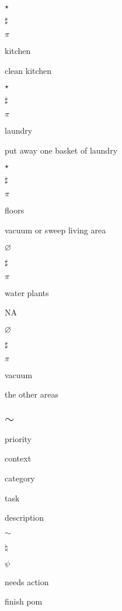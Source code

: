 \documentclass[]{book}
\newenvironment{Shaded}{\begin{snugshade}}{\end{snugshade}}
\newcommand{\KeywordTok}[1]{\textcolor[rgb]{0.13,0.29,0.53}{\textbf{#1}}}
\newcommand{\NormalTok}[1]{#1}
\newcommand{\OperatorTok}[1]{\textcolor[rgb]{0.81,0.36,0.00}{\textbf{#1}}}
\newcommand{\StringTok}[1]{\textcolor[rgb]{0.31,0.60,0.02}{#1}}
\begin{document}
\(\star\)

\(\sharp\)

\(\pi\)

kitchen

clean kitchen

\(\star\)

\(\sharp\)

\(\pi\)

laundry

put away one basket of laundry

\(\star\)

\(\sharp\)

\(\pi\)

floors

vacuum or sweep living area

\(\varnothing\)

\(\sharp\)

\(\pi\)

water plants

NA

\(\varnothing\)

\(\sharp\)

\(\pi\)

vacuum

the other areas

\hypertarget{sim}{%
\subsection{\texorpdfstring{\(\sim\)}{\textbackslash{}sim}}\label{sim}}

\begin{Shaded}
\end{Shaded}

priority

context

category

task

description

\(\sim\)

\(\natural\)

\(\psi\)

needs action

finish pom
\end{document}
